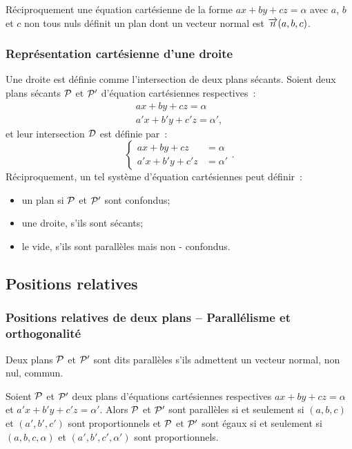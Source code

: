 Réciproquement une équation cartésienne de la forme \(ax + by + cz = \alpha\) 
avec \(a\), \(b\) et \(c\) non tous nuls définit un plan dont un vecteur 
normal est \(\vect{n}(a, b, c)\).

\subsubsection{Représentation cartésienne d'une droite}

Une droite est définie comme l'intersection de deux plans sécants. Soient deux 
plans sécants \(\P\) et \(\P'\) d'équation cartésiennes respectives~:
\begin{align}
  ax + by + cz = \alpha \\ a'x + b'y + c'z = \alpha',
\end{align}
et leur intersection \(\Dr\) est définie par~:
\begin{equation}
  \begin{cases}
    ax + by + cz & = \alpha \\
    a'x + b'y + c'z& = \alpha'
  \end{cases}.
\end{equation}
Réciproquement, un tel système d'équation cartésiennes peut définir~:
\begin{itemize}
  \item un plan si \(\P\) et \(\P'\) sont confondus;
  \item une droite, s'ils sont sécants;
  \item le vide, s'ils sont parallèles mais non - confondus.
\end{itemize}

\subsection{Positions relatives}

\subsubsection{Positions relatives de deux plans -- Parallélisme et 
orthogonalité}

\begin{defdef}
  Deux plans \(\P\) et \(\P'\) sont dits parallèles s'ils admettent un vecteur 
  normal, non nul, commun.
\end{defdef}

\begin{prop}
  Soient \(\P\) et \(\P'\) deux plans d'équations cartésiennes respectives 
  \(ax + by + cz = \alpha\) et \(a'x + b'y + c'z = \alpha'\). Alors \(\P\) et 
  \(\P'\) sont parallèles si et seulement si \((a, b, c)\) et \((a', b', c')\) 
  sont proportionnels et \(\P\) et \(\P'\) sont égaux si et seulement si \((a, 
  b, c, \alpha)\) et \((a', b', c', \alpha')\) sont proportionnels.
\end{prop}

